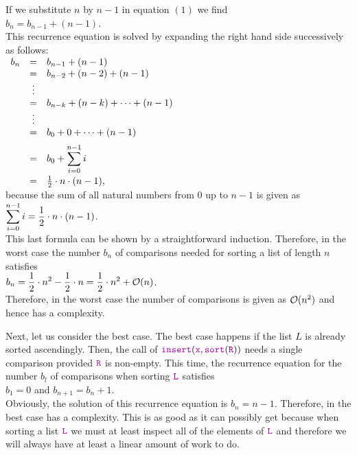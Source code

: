 If we substitute $n$ by $n-1$ in equation $(1)$ we find
\\[0.2cm]
\hspace*{1.3cm}
$b_n = b_{n-1} + (n - 1)$.
\\[0.2cm]
This recurrence equation is solved by expanding the right hand side successively as follows:
\\[0.2cm]
\hspace*{1.3cm}
$
\begin{array}[t]{lcl}
  b_{n} & = & b_{n-1} + (n - 1)                     \\ 
        & = & b_{n-2} + (n - 2) + (n - 1)           \\ 
        & \vdots &                                  \\
        & = & b_{n-k} + (n - k) + \cdots + (n - 1)  \\ 
        & \vdots &                                  \\
        & = & b_{0} + 0 + \cdots + (n - 1)      \\[0.2cm] 
        & = & \displaystyle b_{0} + \sum\limits_{i = 0}^{n - 1} i \\[0.4cm]
        & = & \frac{1}{2} \cdot n \cdot (n - 1),
\end{array}
$
\\[0.2cm]
because the sum of all natural numbers from 0 up to  $n - 1$ is given as
\\[0.2cm]
\hspace*{1.3cm}
$\displaystyle\sum\limits_{i = 0}^{n - 1} i  = \frac{1}{2} \cdot n \cdot (n - 1)$.
\\[0.2cm]
This last formula can be shown by a straightforward induction.  Therefore, in the worst case the number $b_n$ of
comparisons needed for sorting a list of length $n$  satisfies 
\\[0.2cm]
\hspace*{1.3cm}
$\displaystyle b_n = \frac{1}{2} \cdot n^2 - \frac{1}{2} \cdot n = \frac{1}{2} \cdot n^2 + \mathcal{O}(n)$.
\\[0.2cm]
Therefore, in the worst case the number of comparisons is given as $\mathcal{O}(n^2)$ and hence
 has a  complexity.


Next, let us consider the best case.  The best case happens if the list $L$ is already sorted
ascendingly.  Then, the call of 
$\mytt{insert}(\mytt{x},\mytt{sort}(\mytt{R}))$ needs a single comparison provided $\mytt{R}$ is non-empty.  This time, the recurrence
equation for the number $b_l$ of comparisons when sorting $\mytt{L}$ satisfies
 \\[0.2cm]
\hspace*{1.3cm}
$b_1 = 0$ \quad and \quad $b_{n+1} = b_n + 1$. 
\\[0.2cm]
Obviously, the solution of this recurrence equation is $b_n = n-1$.  Therefore, in the best case
 has a  complexity.  This is as good as it can possibly get because when
sorting a list $\mytt{L}$ we must at least inspect all of the elements of $\mytt{L}$ and therefore we will
always have at least a linear amount of work to do.


